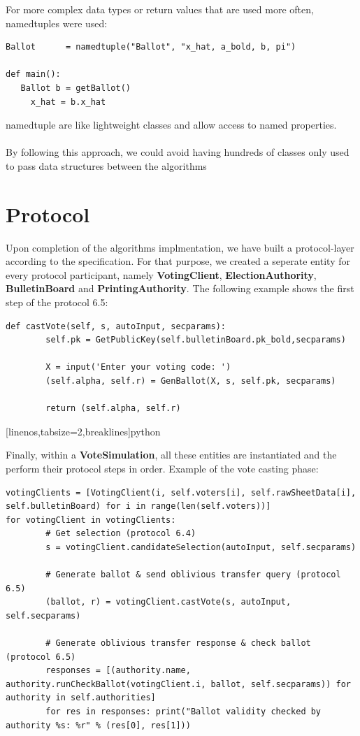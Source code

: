 \documentclass[a4paper,12pt]{report}
\theoremstyle{definition}
\begin{document}
For more complex data types or return values that are used more often, namedtuples were used:
\begin{verbatim}
Ballot      = namedtuple("Ballot", "x_hat, a_bold, b, pi")

def main():
   Ballot b = getBallot()
	 x_hat = b.x_hat
\end{verbatim}
namedtuple are like lightweight classes and allow access to named properties.
\\\\\noindent By following this approach, we could avoid having hundreds of classes only used to pass data structures between the algorithms
\section{Protocol}
Upon completion of the algorithms implmentation, we have built a protocol-layer according to the specification. For that purpose, we created a seperate entity for every protocol participant, namely \textbf{VotingClient}, \textbf{ElectionAuthority}, \textbf{BulletinBoard} and \textbf{PrintingAuthority}. The following example shows the first step of the protocol 6.5:
\begin{verbatim}
def castVote(self, s, autoInput, secparams):
		self.pk = GetPublicKey(self.bulletinBoard.pk_bold,secparams)
   	
		X = input('Enter your voting code: ')
		(self.alpha, self.r) = GenBallot(X, s, self.pk, secparams)

		return (self.alpha, self.r)
\end{verbatim}[linenos,tabsize=2,breaklines]{python}

Finally, within a \textbf{VoteSimulation}, all these entities are instantiated and the perform their protocol steps in order. Example of the vote casting phase:
\begin{verbatim}
votingClients = [VotingClient(i, self.voters[i], self.rawSheetData[i], self.bulletinBoard) for i in range(len(self.voters))]
for votingClient in votingClients:		
		# Get selection (protocol 6.4)
		s = votingClient.candidateSelection(autoInput, self.secparams)
		
		# Generate ballot & send oblivious transfer query (protocol 6.5)
		(ballot, r) = votingClient.castVote(s, autoInput, self.secparams)

		# Generate oblivious transfer response & check ballot (protocol 6.5)
		responses = [(authority.name, authority.runCheckBallot(votingClient.i, ballot, self.secparams)) for authority in self.authorities]
		for res in responses: print("Ballot validity checked by authority %s: %r" % (res[0], res[1]))
\end{verbatim}
\end{document}
